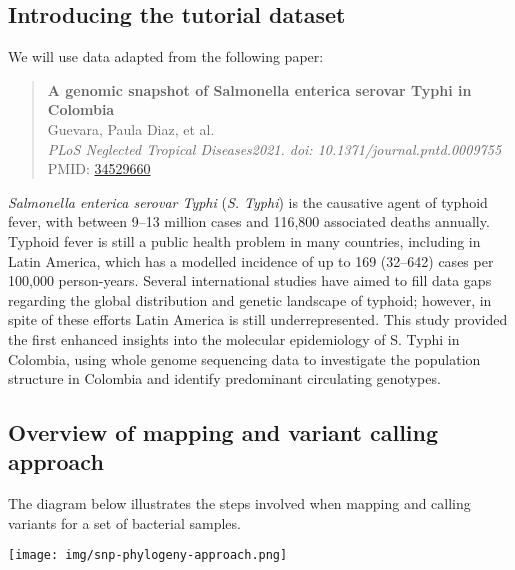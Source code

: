 \documentclass[11pt]{article}
\begin{document}
    \hypertarget{introducing-the-tutorial-dataset}{%
\subsection{Introducing the tutorial
dataset}\label{introducing-the-tutorial-dataset}}

We will use data adapted from the following paper:

\begin{quote}
\textbf{A genomic snapshot of Salmonella enterica serovar Typhi in
Colombia}\\
Guevara, Paula Diaz, et al.\\
\textit{PLoS Neglected Tropical Diseases2021. doi:
10.1371/journal.pntd.0009755}\\
PMID:
\href{https://www.ncbi.nlm.nih.gov/pmc/articles/PMC8478212/}{34529660}
\end{quote}

\textit{Salmonella enterica serovar Typhi} (\textit{S. Typhi}) is the
causative agent of typhoid fever, with between 9--13 million cases and
116,800 associated deaths annually. Typhoid fever is still a public
health problem in many countries, including in Latin America, which has
a modelled incidence of up to 169 (32--642) cases per 100,000
person-years. Several international studies have aimed to fill data gaps
regarding the global distribution and genetic landscape of typhoid;
however, in spite of these efforts Latin America is still
underrepresented. This study provided the first enhanced insights into
the molecular epidemiology of S. Typhi in Colombia, using whole genome
sequencing data to investigate the population structure in Colombia and
identify predominant circulating genotypes.

    \hypertarget{overview-of-mapping-and-variant-calling-approach}{%
\subsection{Overview of mapping and variant calling
approach}\label{overview-of-mapping-and-variant-calling-approach}}

The diagram below illustrates the steps involved when mapping and
calling variants for a set of bacterial samples.


\begin{center}
\texttt{[image: img/snp-phylogeny-approach.png]}
\end{center}
\end{document}
